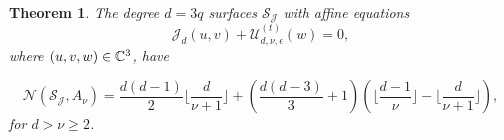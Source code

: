 \documentclass{birkjour_t2}
\newtheorem{thm}{Theorem}[section]
\theoremstyle{definition}
\theoremstyle{remark}
\numberwithin{equation}{section}
\begin{document}
 \bigskip\par
      \begin{thm} 
The degree $d=3q$ surfaces $\mathcal{S_{J}}$ with affine equations  
           \begin{equation} 
{\mathcal{J}}_{d}(u, v)+{\mathcal{U}}^{(t)}_{d,\nu,\epsilon}(w)=0,
      \end{equation} 
 where $(u, v, w) \in {\Bbb{C}^3}$,  have 
 \par       
 \begin{equation} 
\mathcal{N}(\mathcal{S_{J}}, A_{\nu})= \frac{d(d-1)}{2}  \Big \lfloor \frac{d}{\nu+1} \Big \rfloor+\left(\frac{d(d-3)}{3}+1\right)\left(\Big \lfloor \frac{d-1}{\nu}   \Big \rfloor-    \Big \lfloor \frac{d}{\nu+1}   \Big \rfloor\right),
 \end{equation}  
 for $d>\nu\geq 2$.

 \end{thm}
 
\end{document}

